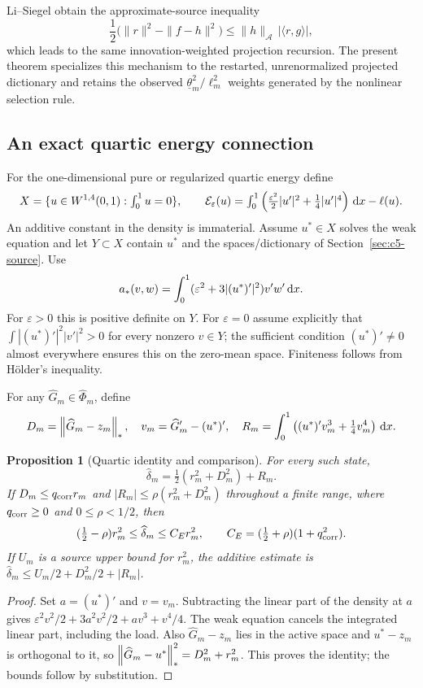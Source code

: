 \documentclass[11pt]{article}
\newtheorem{proposition}[theorem]{Proposition}
\theoremstyle{remark}
\begin{document}
Li--Siegel \cite[Corollary~4.2 and equation~(4.11)]{LiSiegelEntropy2024} obtain the approximate-source inequality
\[
 \frac12\big(\|r\|^2-\|f-h\|^2\big)
 \leq \|h\|_{\mathcal A}\,|\langle r,g\rangle|,
\]
which leads to the same innovation-weighted projection recursion. The
present theorem specializes this mechanism to the restarted, unrenormalized
projected dictionary and retains the observed
\(\underline\theta_m^2/\ell_m^2\) weights generated by the nonlinear selection rule.

\subsection{An exact quartic energy connection}
\label{sec:c5-quartic}

For the one-dimensional pure or regularized quartic energy define
\[
 X=\{u\in W^{1,4}(0,1):\textstyle\int_0^1u=0\},\qquad
 \mathcal E_\varepsilon(u)=\int_0^1
       \left(\tfrac{\varepsilon^2}2|u'|^2+\tfrac14|u'|^4\right)\,\mathrm d x-\ell(u).
\]
An additive constant in the density is immaterial.
Assume $u^*\in X$ solves the weak equation and let $Y\subset X$
contain $u^*$ and the spaces/dictionary of
Section~\ref{sec:c5-source}. Use
\[
 a_*(v,w)=\int_0^1(\varepsilon^2+3|(u^*)'|^2)v'w'\,\mathrm d x .
\]
For $\varepsilon>0$ this is positive definite on $Y$.
For $\varepsilon=0$ assume explicitly that
$\int |(u^*)'|^2|v'|^2>0$ for every nonzero $v\in Y$;
the sufficient condition $(u^*)'\ne0$ almost everywhere ensures this
on the zero-mean space. Finiteness follows from H\"older's inequality.

For any $\widehat G_m\in\widehat\Phi_m$, define
\[
 D_m=\left\lVert\widehat G_m-z_m\right\rVert_*,\quad
 v_m=\widehat G_m'-(u^*)',\quad
 R_m=\int_0^1\left((u^*)'v_m^3+\tfrac14v_m^4\right)\,\mathrm d x .
\]
\begin{proposition}[Quartic identity and comparison]
\label{prop:c5-quartic}
For every such state,
\begin{equation}
 \widehat\delta_m=\tfrac12(r_m^2+D_m^2)+R_m.
 \label{eq:c5-quartic}
\end{equation}
If $D_m\leq q_{\rm corr}r_m$ and
$|R_m|\leq\rho(r_m^2+D_m^2)$ throughout a finite range, where
$q_{\rm corr}\geq0$ and $0\leq\rho<1/2$, then
\begin{equation}
 (\tfrac12-\rho)r_m^2\leq\widehat\delta_m
 \leq C_Er_m^2,\qquad C_E=(\tfrac12+\rho)(1+q_{\rm corr}^2).
 \label{eq:c5-quartic-comparison}
\end{equation}
If \(U_m\) is a source upper bound for \(r_m^2\), the additive estimate is \(\widehat\delta_m\le U_m/2+D_m^2/2+|R_m|\).
\end{proposition}
\begin{proof}
Set $a=(u^*)'$ and $v=v_m$. Subtracting the linear part of the density
at $a$ gives
$\varepsilon^2v^2/2+3a^2v^2/2+av^3+v^4/4$.
The weak equation cancels the integrated linear part, including the load.
Also $\widehat G_m-z_m$ lies in the active space and
$u^*-z_m$ is orthogonal to it, so
$\left\lVert\widehat G_m-u^*\right\rVert_*^2=D_m^2+r_m^2$.
This proves the identity; the bounds follow by substitution.
\end{proof}
\end{document}
